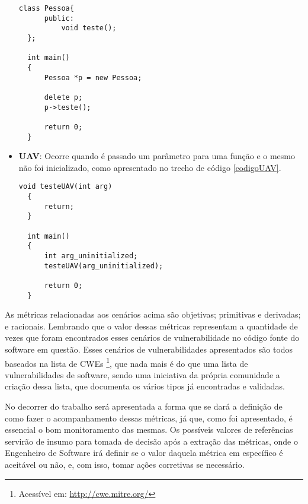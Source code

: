 \begin{itemize}
    \begin{lstlisting}[caption={Código exemplo UAF}, label=codigoUAF]
  class Pessoa{
      public:
          void teste();
  };

  int main()
  {
      Pessoa *p = new Pessoa;

      delete p;
      p->teste();

      return 0;
  }
    \end{lstlisting}
  \item \textbf{UAV}: Ocorre quando é passado um parâmetro para uma função e o mesmo não foi inicializado, como apresentado no 
    trecho de código \ref{codigoUAV}.

    \begin{lstlisting}[caption={Código exemplo UAV}, label=codigoUAV]
  void testeUAV(int arg)
  {
      return;
  }

  int main()
  {
      int arg_uninitialized;
      testeUAV(arg_uninitialized);
      
      return 0;
  }
    \end{lstlisting}
\end{itemize}

As métricas relacionadas aos cenários acima são objetivas; primitivas e derivadas; e racionais. Lembrando que o valor dessas 
métricas representam a quantidade de vezes que foram encontrados esses cenários de vulnerabilidade no código fonte do software 
em questão. Esses cenários de vulnerabilidades apresentados são todos baseados na
lista de CWEs \footnote{Acessível em: \url{http://cwe.mitre.org/}}, que nada
mais é do que uma lista de vulnerabilidades de software, sendo uma iniciativa da
própria comunidade a criação dessa lista, que documenta os vários tipos já encontradas e validadas.

No decorrer do trabalho será apresentada a forma que se dará a definição de como
fazer o acompanhamento dessas
métricas, já que, como foi apresentado, é essencial o bom monitoramento das
mesmas. Os possíveis valores de referências servirão
de insumo para tomada de decisão após a extração das métricas, onde o Engenheiro
de Software irá definir se o valor daquela
métrica em específico é aceitável ou não, e, com isso, tomar ações corretivas se necessário.

